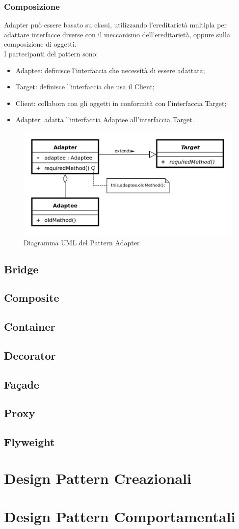 \subsubsection{Composizione}
Adapter può essere basato su classi, utilizzando l'ereditarietà multipla per adattare interfacce diverse con il meccanismo dell'ereditarietà, oppure sulla composizione di oggetti.\\
I partecipanti del pattern sono:
\begin{itemize}
	\item Adaptee: definisce l'interfaccia che necessità di essere adattata;
	\item Target: definisce l'interfaccia che usa il Client;
	\item Client: collabora con gli oggetti in conformità con l'interfaccia Target;
	\item Adapter: adatta l'interfaccia Adaptee all'interfaccia Target.
\end{itemize}

\begin{figure}[H]
	\centering
	\includegraphics[width=0.7\linewidth]{res/img/DP_Adapter}
	\caption{Diagramma UML del Pattern Adapter}
	\label{fig:dpadapter}
\end{figure}

\subsection{Bridge}
\subsection{Composite}
\subsection{Container}
\subsection{Decorator}
\subsection{Façade}
\subsection{Proxy}
\subsection{Flyweight}

\section{Design Pattern Creazionali}

\section{Design Pattern Comportamentali}

